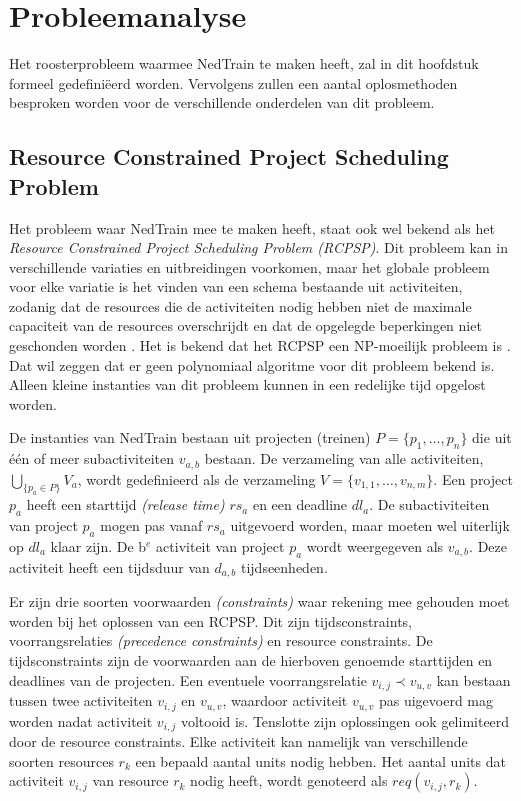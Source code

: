 \section{Probleemanalyse}
\label{sec:probleemanalyse}

Het roosterprobleem waarmee NedTrain te maken heeft, zal in dit hoofdstuk formeel gedefini\"eerd worden. Vervolgens zullen een aantal oplosmethoden besproken worden voor de verschillende onderdelen van dit probleem.

\subsection{Resource Constrained Project Scheduling Problem}
Het probleem waar NedTrain mee te maken heeft, staat ook wel bekend als het \emph{Resource Constrained Project Scheduling Problem (RCPSP)}. Dit probleem kan in verschillende variaties en uitbreidingen voorkomen, maar het globale probleem voor elke variatie is het vinden van een schema bestaande uit activiteiten, zodanig dat de resources die de activiteiten nodig hebben niet de maximale capaciteit van de resources overschrijdt en dat de opgelegde beperkingen niet geschonden worden \cite{lombardi2010constraint}. Het is bekend dat het RCPSP een NP-moeilijk probleem is \cite{blazewicz1983scheduling}. Dat wil zeggen dat er geen polynomiaal algoritme voor dit probleem bekend is. Alleen kleine instanties van dit probleem kunnen in een redelijke tijd opgelost worden. 

De instanties van NedTrain bestaan uit projecten (treinen) $P = \{p_1, \dots , p_n\}$ die uit \'e\'en of meer subactiviteiten $v_{a,b}$ bestaan. De verzameling van alle activiteiten, $\bigcup_{\{p_a \in P\}} V_a$, wordt gedefinieerd als de verzameling $V = \{v_{1,1}, \dots , v_{n,m}\}$. Een project $p_a$ heeft een starttijd \emph{(release time)} $rs_a$ en een deadline $dl_a$. De subactiviteiten van project $p_a$ mogen pas vanaf $rs_a$ uitgevoerd worden, maar moeten wel uiterlijk op $dl_a$ klaar zijn. De b$^e$ activiteit van project $p_a$ wordt weergegeven als $v_{a,b}$. Deze activiteit heeft een tijdsduur van $d_{a,b}$ tijdseenheden.

Er zijn drie soorten voorwaarden \emph{(constraints)} waar rekening mee gehouden moet worden bij het oplossen van een RCPSP. Dit zijn tijdsconstraints, voorrangsrelaties \emph{(precedence constraints)} en resource constraints. De tijdsconstraints zijn de voorwaarden aan de hierboven genoemde starttijden en deadlines van de projecten. Een eventuele voorrangsrelatie $v_{i,j} \prec v_{u,v}$ kan bestaan tussen twee activiteiten $v_{i,j}$ en $v_{u,v}$, waardoor activiteit $v_{u,v}$ pas uigevoerd mag worden nadat activiteit $v_{i,j}$ voltooid is. Tenslotte zijn oplossingen ook gelimiteerd door de resource constraints. Elke activiteit kan namelijk van verschillende soorten resources $r_k$ een bepaald aantal units nodig hebben. Het aantal units dat activiteit $v_{i,j}$ van resource $r_k$ nodig heeft, wordt genoteerd als $req(v_{i,j},r_k)$.

